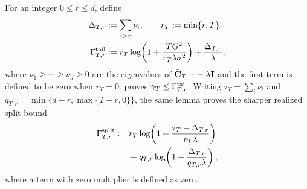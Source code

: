 For an integer $0\le r\le d$, define
\begin{equation}\label{eq:gamma-tail-main}
\begin{aligned}
 \Delta_{T,r}&:=\sum_{i>r}\nu_i,\qquad
 r_T:=\min\{r,T\},\\
 \Gamma^{\rm tail}_{T,r}
 &:=r_T\log\!\left(1+\frac{TG^2}
 {r_T\lambda\sigma^2}\right)+\frac{\Delta_{T,r}}{\lambda},
\end{aligned}
\end{equation}
where $\nu_1\ge\cdots\ge\nu_d\ge0$ are the eigenvalues of
$\bar{\mathbf{C}}_{T+1}-\lambda\mathbf{I}$ and the first term is defined to be zero when
$r_T=0$.   proves
$\gamma_T\le\Gamma^{\rm tail}_{T,r}$.
Writing $\tau_T=\sum_i\nu_i$ and
$q_{T,r}=\min\{d-r,\max\{T-r,0\}\}$, the same lemma proves the sharper
realized split bound
\begin{equation}\label{eq:gamma-split-main}
\begin{aligned}
 \Gamma^{\rm split}_{T,r}:={}&
 r_T\log\!\left(1+\frac{\tau_T-\Delta_{T,r}}{r_T\lambda}\right)\\
 &+q_{T,r}\log\!\left(1+\frac{\Delta_{T,r}}{q_{T,r}\lambda}\right),
\end{aligned}
\end{equation}
where a term with zero multiplier is defined as zero.

